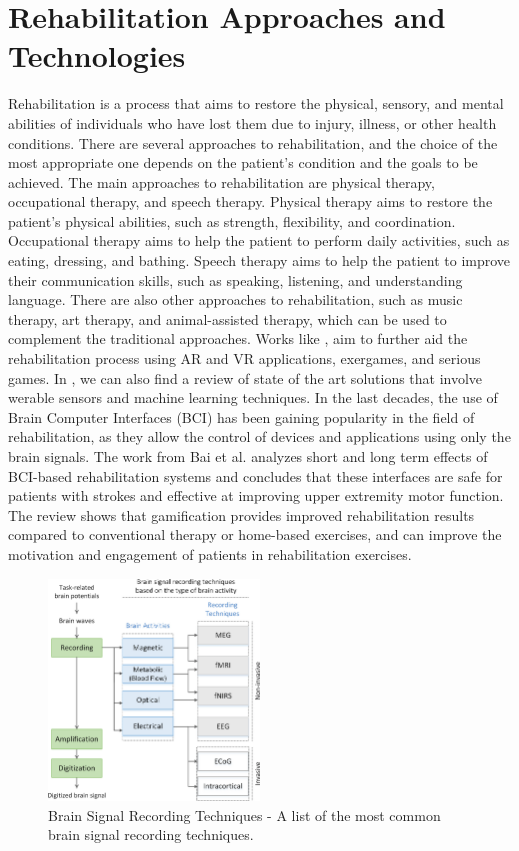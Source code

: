 \section{Rehabilitation Approaches and Technologies}
Rehabilitation is a process that aims to restore the physical, sensory, and mental abilities of individuals who have lost them due to injury, illness, or other health conditions.
There are several approaches to rehabilitation, and the choice of the most appropriate one depends on the patient's condition and the goals to be achieved.
The main approaches to rehabilitation are physical therapy, occupational therapy, and speech therapy.
Physical therapy aims to restore the patient's physical abilities, such as strength, flexibility, and coordination.
Occupational therapy aims to help the patient to perform daily activities, such as eating, dressing, and bathing.
Speech therapy aims to help the patient to improve their communication skills, such as speaking, listening, and understanding language.
There are also other approaches to rehabilitation, such as music therapy, art therapy, and animal-assisted therapy, which can be used to complement the traditional approaches.
Works like \cite{202306.0333, 5567156, 10.4108/icst.pervasivehealth.2014.255277, trombetta}, aim to further aid the rehabilitation process using AR and VR applications, exergames, and serious games.
In \cite{BOUKHENNOUFA2022103197}, we can also find a review of state of the art solutions that involve werable sensors and machine learning techniques.
In the last decades, the use of Brain Computer Interfaces (BCI) has been gaining popularity in the field of rehabilitation, as they allow the control of devices and applications using only the brain signals.
The work from Bai et al. \cite{bai_immediate_2020} analyzes short and long term effects of BCI-based rehabilitation systems and concludes that these interfaces are safe for patients with strokes and effective at improving upper extremity motor function.
The review \cite{alfieri_gamification_2022} shows that gamification provides improved rehabilitation results compared to conventional therapy or home-based exercises, and can improve the motivation and engagement of patients in rehabilitation exercises.

\begin{figure}[htbp!]
    \centering
    \includegraphics[width=0.5\textwidth]{Figures/Related/brain_signal_recording_techniques}
    \caption{Brain Signal Recording Techniques - A list of the most common brain signal recording techniques. \cite{altaheri2023deep}}
\end{figure}
